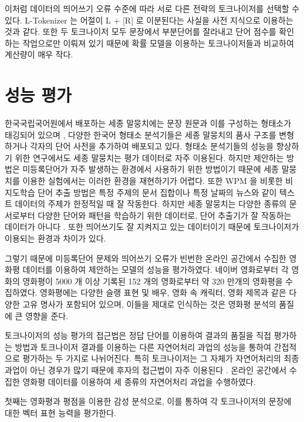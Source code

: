 \documentclass[oneside, ko,phd]{snuthesis_utf8_kor}
\begin{document}
이처럼 데이터의 띄어쓰기 오류 수준에 따라 서로 다른 전략의 토크나이저를 선택할 수 있다.
L-Tokenizer 는 어절이 L + [R] 로 이분된다는 사실을 사전 지식으로 이용하는 것과 같다.
또한 두 토크나이저 모두 문장에서 부분단어를 잘라내고 단어 점수를 확인하는 작업으로만 이뤄져 있기 때문에 확률 모델을 이용하는 토크나이저들과 비교하여 계산량이 매우 작다.


\section{성능 평가} \label{word_extraction_performance}
한국국립국어원에서 배포하는 세종 말뭉치에는 문장 원문과 이를 구성하는 형태소가 태깅되어 있으며 \cite{kim200121st}, 다양한 한국어 형태소 분석기들은 세종 말뭉치의 품사 구조를 변형하거나 각자의 단어 사전을 추가하여 배포되고 있다.
형태소 분석기들의 성능을 향상하기 위한 연구에서도 세종 말뭉치는 평가 데이터로 자주 이용된다.
하지만 제안하는 방법은 미등록단어가 자주 발생하는 환경에서 사용하기 위한 방법이기 때문에 세종 말뭉치를 이용한 실험에서는 이러한 환경을 재현하기가 어렵다.
또한 WPM 을 비롯한 비지도학습 단어 추출 방법은 특정 주제의 문서 집합이나 특정 날짜의 뉴스와 같이 텍스트 데이터의 주제가 한정적일 때 잘 작동한다.
하지만 세종 말뭉치는 다양한 종류의 문서로부터 다양한 단어와 패턴을 학습하기 위한 데이터로, 단어 추출기가 잘 작동하는 데이터가 아니다 \cite{kim2014kr}.
또한 띄어쓰기도 잘 지켜지고 있는 데이터이기 때문에 토크나이저가 이용되는 환경과 차이가 있다.

그렇기 때문에 미등록단어 문제와 띄어쓰기 오류가 빈번한 온라인 공간에서 수집한 영화평 데이터를 이용하여 제안하는 모델의 성능을 평가하였다.
네이버 영화로부터 각 영화의 영화평이 5000 개 이상 기록된 152 개의 영화로부터 약 320 만개의 영화평을 수집하였다.
영화평에는 다양한 슬랭 표현 및 배우, 영화 속 캐릭터, 영화 제목과 같은 다양한 고유 명사가 포함되어 있으며, 이들을 제대로 인식하는 것은 영화평 분석의 품질에 큰 영향을 준다.

토크나이저의 성능 평가의 접근법은 정답 단어를 이용하여 결과의 품질을 직접 평가하는 방법과 토크나이저 결과를 이용하는 다른 자연어처리 과업의 성능을 통하여 간접적으로 평가하는 두 가지로 나뉘어진다.
특히 토크나이저는 그 자체가 자연어처리의 최종 과업이 아닌 경우가 많기 때문에 후자의 접근법이 자주 이용된다 \cite{chung2009unsupervised}.
온라인 공간에서 수집한 영화평 데이터를 이용하여 세 종류의 자연어처리 과업을 수행하였다.

첫째는 영화평과 평점을 이용한 감성 분석으로, 이를 통하여 각 토크나이저의 문장에 대한 벡터 표현 능력을 평가한다.
\end{document}
